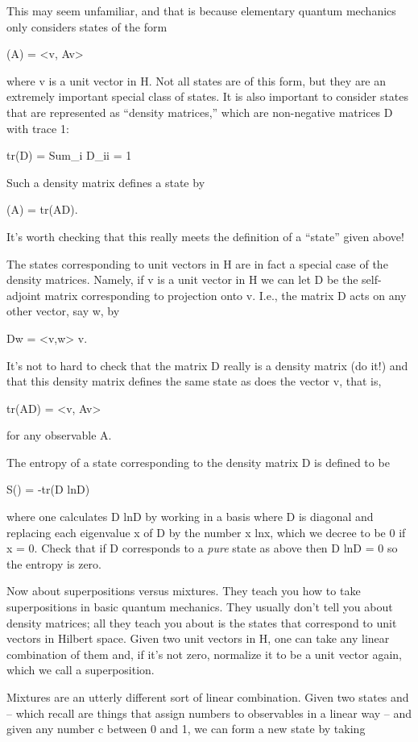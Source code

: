 This may seem unfamiliar, and that is because elementary quantum
mechanics only considers states of the form 

\Psi (A) = <v, Av>

where  v  is a unit vector in H.  Not all states are of this
form, but they are an extremely important special class of
states.  It is also important to consider states that are
represented as ``density matrices,'' which are non-negative
matrices D with trace 1:

tr(D) = Sum_i D_{ii} = 1

Such a density matrix defines a state \Psi  by

\Psi (A) = tr(AD).

It's worth checking that this really meets the definition of a
``state'' given above!

The states corresponding to unit vectors in H are in fact a
special case of the density matrices.  Namely, if v is a unit
vector in H we can let D be the self-adjoint matrix corresponding
to projection onto v.  I.e., the matrix D acts on any other
vector, say w, by

Dw = <v,w> v.

It's not to hard to check that the matrix D really is a density
matrix (do it!) and that this density matrix defines the same
state as does the vector v, that is,

tr(AD) = <v, Av>

for any observable A.

The entropy of a state \Psi  corresponding to the density matrix D is
defined to be 

S(\Psi ) = -tr(D lnD)

where one calculates D lnD by working in a basis where D is diagonal and
replacing each eigenvalue x of D by the number x lnx, which we
decree to be 0 if x = 0.  Check that if D corresponds to
a \emph{pure} state as above then D lnD = 0 so the entropy is zero.

Now about superpositions versus mixtures.  They teach you how to take
superpositions in basic quantum mechanics.  They usually don't tell you
about density matrices; all they teach you about is the states
that correspond to unit vectors in Hilbert space.  Given two unit vectors in
H, one can take any linear combination of them and, if it's not zero,
normalize it to be a unit vector again, which we call a superposition.

Mixtures are an utterly different sort of linear combination.  Given
two states \Psi  and \Phi  -- which recall are things that assign numbers
to observables in a linear way -- and given any number c between 0 and
1, we can form a new state by taking

